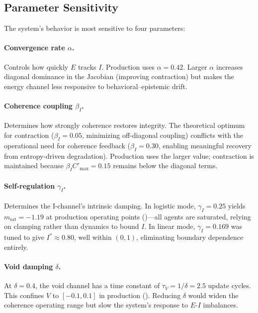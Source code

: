 \documentclass[11pt,twocolumn]{article}
\begin{document}
\subsection{Parameter Sensitivity}

The system's behavior is most sensitive to four parameters:

\paragraph{Convergence rate $\alpha$.}
Controls how quickly $E$ tracks $I$. Production uses
$\alpha = 0.42$. Larger $\alpha$ increases diagonal dominance in
the Jacobian (improving contraction) but makes the energy channel
less responsive to behavioral--epistemic drift.

\paragraph{Coherence coupling $\beta_I$.}
Determines how strongly coherence restores integrity. The theoretical
optimum for contraction ($\beta_I = 0.05$, minimizing off-diagonal
coupling) conflicts with the operational need for coherence feedback
($\beta_I = 0.30$, enabling meaningful recovery from entropy-driven
degradation). Production uses the larger value; contraction is
maintained because $\beta_I C'_{\max} = 0.15$ remains below the
diagonal terms.

\paragraph{Self-regulation $\gamma_I$.}
Determines the I-channel's intrinsic damping. In logistic mode,
$\gamma_I = 0.25$ yields $m_{\text{sat}} = -1.19$ at production
operating points ()---all agents are saturated,
relying on clamping rather than dynamics to bound $I$. In linear mode,
$\gamma_I = 0.169$ was tuned to give $I^* \approx 0.80$, well within
$(0,1)$, eliminating boundary dependence entirely.

\paragraph{Void damping $\delta$.}
At $\delta = 0.4$, the void channel has a time constant of
$\tau_V = 1/\delta = 2.5$ update cycles. This confines $V$ to
$[-0.1, 0.1]$ in production (). Reducing
$\delta$ would widen the coherence operating range but slow the
system's response to $E$-$I$ imbalances.
\end{document}
